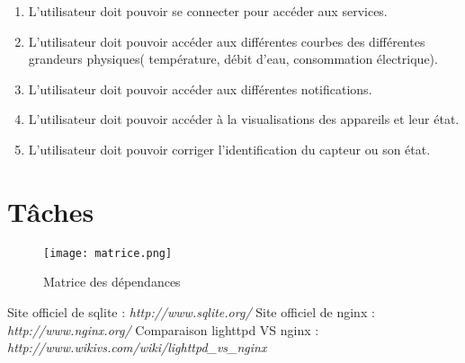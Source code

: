 \documentclass[10pt,a4paper]{article}
\begin{document}
\begin{enumerate}[label=\bfseries US\arabic* :]
    \item L'utilisateur doit pouvoir se connecter pour accéder aux services.
    \item L'utilisateur doit pouvoir accéder aux différentes courbes des différentes grandeurs physiques( température, débit d'eau, consommation électrique).
    \item L'utilisateur doit pouvoir accéder aux différentes notifications.
    \item L'utilisateur doit pouvoir accéder à la visualisations des appareils et leur état.
    \item L'utilisateur doit pouvoir corriger l'identification du capteur ou son état.
\end{enumerate}

\section{Tâches}

 \begin{figure}[h]
     \centering %
     \texttt{[image: matrice.png]}
     \caption{Matrice des dépendances}  %
 \end{figure}


\begin{thebibliography}{10}
    Site officiel de sqlite : \emph{http://www.sqlite.org/}
    Site officiel de nginx : \emph{http://www.nginx.org/}
    Comparaison lighttpd VS nginx :  \emph{http://www.wikivs.com/wiki/lighttpd\_vs\_nginx}
\end{thebibliography}
\end{document}
